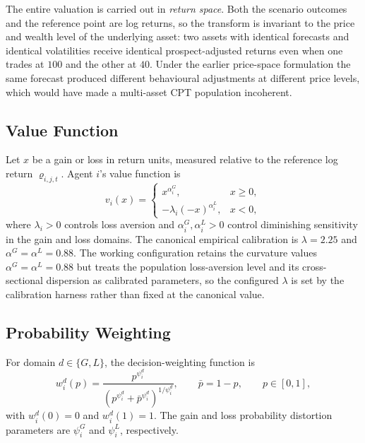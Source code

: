 \documentclass[12pt, a4paper]{article}
\begin{document}
    The entire valuation is carried out in \emph{return space}. Both the scenario
    outcomes and the reference point are log returns, so the transform is
    invariant to the price and wealth level of the underlying asset: two assets
    with identical forecasts and identical volatilities receive identical
    prospect-adjusted returns even when one trades at \(100\) and the other at
    \(40\). Under the earlier price-space formulation the same forecast produced
    different behavioural adjustments at different price levels, which would have
    made a multi-asset CPT population incoherent.

    \subsection{Value Function}

    Let \(x\) be a gain or loss in return units, measured relative to the
    reference log return \(\varrho_{i,j,t}\). Agent \(i\)'s value function is
    \[
        v_i(x)=
        \begin{cases}
            x^{\alpha_i^G}, & x\ge 0,\\[0.8ex]
            -\lambda_i{\left(-x\right)}^{\alpha_i^L}, & x<0,
        \end{cases}
    \]
    where \(\lambda_i>0\) controls loss aversion and
    \(\alpha_i^G,\alpha_i^L>0\) control diminishing sensitivity in the gain and
    loss domains. The canonical empirical calibration is
    \(\lambda=2.25\) and \(\alpha^G=\alpha^L=0.88\). The working configuration
    retains the curvature values \(\alpha^G=\alpha^L=0.88\) but treats the
    population loss-aversion level and its cross-sectional dispersion as
    calibrated parameters, so the configured \(\lambda\) is set by the
    calibration harness rather than fixed at the canonical value.

    \subsection{Probability Weighting}

    For domain \(d\in\{G,L\}\), the decision-weighting function is
    \[
        w_i^d(p)=
        \frac{p^{\psi_i^d}}
        {{\left(p^{\psi_i^d}+\bar p^{\psi_i^d}\right)}^{1/\psi_i^d}},
        \qquad
        \bar p=1-p,
        \qquad p\in[0,1],
    \]
    with \(w_i^d(0)=0\) and \(w_i^d(1)=1\). The gain and loss probability
    distortion parameters are \(\psi_i^G\) and \(\psi_i^L\), respectively.
\end{document}
